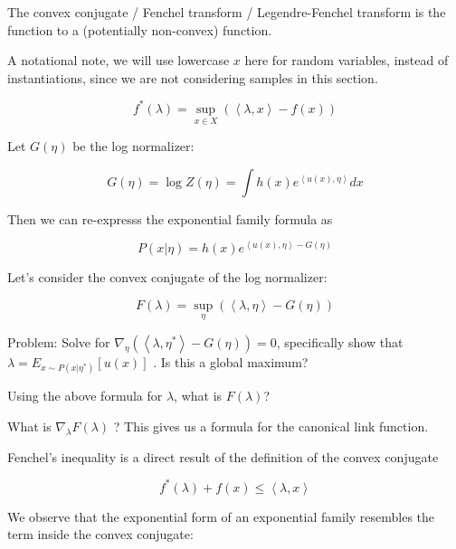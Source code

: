 \documentclass[a4paper]{article}
\begin{document}
The convex conjugate / Fenchel transform / Legendre-Fenchel transform is the function to a (potentially non-convex) function.

A notational note, we will use lowercase $x$ here for random variables, instead of instantiations, since we are not considering samples in this section.

\begin{equation}
  f^*( \lambda ) = \sup_{x \in X} \left( \left< \lambda, x \right> - f(x) \right)
  \label{convex conjugate}
\end{equation}

Let $G(\eta)$ be the log normalizer:

\begin{equation}
  G(\eta) = \log Z(\eta) = \int h(x) e^{ \left< u(x), \eta \right> } dx
  \label{}
\end{equation}

Then we can re-expresss the exponential family formula as

\begin{equation}
  P( x \vert \eta) = h(x) e^{ \left< u(x), \eta \right> - G(\eta) }
  \label{}
\end{equation}

Let's consider the convex conjugate of the log normalizer:

\begin{equation}
  F( \lambda ) = \sup_\eta \left( \left< \lambda, \eta \right> - G(\eta) \right)
  \label{}
\end{equation}

Problem:  
Solve for $ \nabla_\eta \left( \left< \lambda, \eta^* \right> - G(\eta) \right) = 0 $, specifically show that $ \lambda = E_{ x \sim P( x \vert \eta^*) } \left[ u(x) \right] $ .  Is this a global maximum?  

Using the above formula for $\lambda$, what is $F(\lambda)$?  

What is $\nabla_\lambda F(\lambda)$ ?  This gives us a formula for the canonical link function.

Fenchel's inequality is a direct result of the definition of the convex conjugate

\begin{equation}
  f^*( \lambda) + f(x) \leq \left< \lambda, x \right>
  \label{Fenchel's inequality}
\end{equation}

We observe that the exponential form of an exponential family resembles the term inside the convex conjugate:
\end{document}
